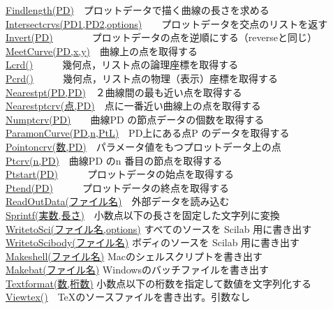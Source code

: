\documentclass[papersize,a4paper,12pt,uplatex]{jsarticle}
\begin{document}
\begin{tabbing}
\hyperlink{findlength}{Findlength(PD)}　\>プロットデータで描く曲線の長さを求める\\
\hyperlink{intersectcrvs}{Intersectcrvs(PD1,PD2,options)}　　\>プロットデータを交点のリストを返す\\
\hyperlink{invert}{Invert(PD)}　　　　\>プロットデータの点を逆順にする（reverseと同じ）\\
\hyperlink{meetcurve}{MeetCurve(PD,x,y)}　\>曲線上の点を取得する\\
\hyperlink{lcrd}{Lcrd()}　　　\>幾何点，リスト点の論理座標を取得する\\
\hyperlink{pcrd}{Pcrd()}　　　\>幾何点，リスト点の物理（表示）座標を取得する\\
\hyperlink{nearestpt}{Nearestpt(PD,PD)}　\>２曲線間の最も近い点を取得する\\
\hyperlink{nearestptcrv}{Nearestptcrv(点,PD)}　\>点に一番近い曲線上の点を取得する\\
\hyperlink{numptcrv}{Numptcrv(PD)}　　\>曲線PD の節点データの個数を取得する\\
\hyperlink{paramoncurve}{ParamonCurve(PD,n,PtL)}　\>PD上にある点P のデータを取得する\\
\hyperlink{pointoncrv}{Pointoncrv(数,PD)}　\>パラメータ値をもつプロットデータ上の点\\
\hyperlink{ptcrv}{Ptcrv(n,PD)}　\>曲線PD のn 番目の節点を取得する\\
\hyperlink{ptstart}{Ptstart(PD)}　　　\>プロットデータの始点を取得する\\
\hyperlink{ptstart}{Ptend(PD)}　　　\>プロットデータの終点を取得する\\
\hyperlink{readoutdata}{ReadOutData(ファイル名)}　\>外部データを読み込む\\
\hyperlink{sprintf}{Sprintf(実数,長さ)}　\>小数点以下の長さを固定した文字列に変換\\
\hyperlink{writetosci}{WritetoSci(ファイル名,options)}     \>すべてのソースを Scilab 用に書き出す\\
\hyperlink{writetosci}{WritetoScibody(ファイル名)}  \>ボディのソースを Scilab 用に書き出す\\
\hyperlink{makeshell}{Makeshell(ファイル名)}  \>Macのシェルスクリプトを書き出す\\
\hyperlink{makeshell}{Makebat(ファイル名)}   \>Windowsのバッチファイルを書き出す\\
\hyperlink{textformat}{Textformat(数,桁数)}   \>小数点以下の桁数を指定して数値を文字列化する\\
\hyperlink{viewtex}{Viewtex()}　\>\TeX のソースファイルを書き出す。引数なし\\

\end{tabbing}
\end{document}
